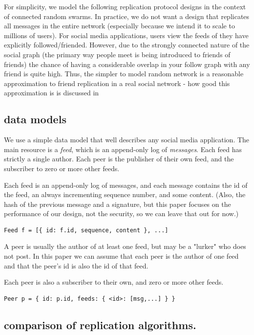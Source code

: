 \documentclass[sigconf]{acmart}
\begin{document}
For simplicity, we model the following replication protocol designs in
the context of connected random swarms.  In practice, we do not want a
design that replicates all messages in the entire network (especially
because we intend it to scale to millions of users). For social media
applications, users view the feeds of they have explicitly
followed/friended. However, due to the strongly connected nature of
the social graph (the primary way people meet is being introduced to
friends of friends) the chance of having a considerable overlap in
your follow graph with any friend is quite high. Thus, the simpler to
model random network is a reasonable approximation to friend
replication in a real social network - how good this approximation is
is discussed in


\subsection{data models}

We use a simple data model that well describes any social media
application.  The main resource is a {\em feed}, which is an
append-only log of {\em messages}.  Each feed has strictly a single
author. Each peer is the publisher of their own feed, and the
subscriber to zero or more other feeds.

Each feed is an append-only log of messages, and each message contains
the id of the feed, an always incrementing sequence number, and some
content.  (Also, the hash of the previous message and a signature, but
this paper focuses on the performance of our design, not the security,
so we can leave that out for now.)

\begin{verbatim}
Feed f = [{ id: f.id, sequence, content }, ...]
\end{verbatim}

A peer is usually the author of at least one feed, but may be a
"lurker" who does not post.  In this paper we can assume that each
peer is the author of one feed and that the peer's id is also the id
of that feed.

Each peer is also a subscriber to their own, and zero or more other feeds.

\begin{verbatim}
Peer p = { id: p.id, feeds: { <id>: [msg,...] } }
\end{verbatim}

\subsection{comparison of replication algorithms.}
\end{document}
